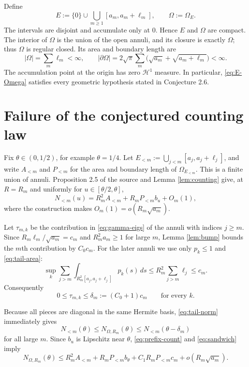 \documentclass[11pt]{article}
\newcommand{\cH}{\mathcal H}
\begin{document}
Define
\begin{equation}\label{eq:E-Omega}
 E:=\{0\}\cup\bigcup_{m\geq1}[a_m,a_m+\ell_m],
 \qquad \Omega:=\Omega_E.
\end{equation}
The intervals are disjoint and accumulate only at $0$.  Hence $E$ and
$\Omega$ are compact.  The interior of $\Omega$ is the union of the open
annuli, and its closure is exactly $\Omega$; thus $\Omega$ is regular closed.
Its area and boundary length are
\begin{equation}\label{eq:geometry}
 |\Omega|=\sum_m\ell_m<\infty,
 \qquad
 |\partial\Omega|
 =2\sqrt\pi\sum_m\bigl(\sqrt{a_m}+\sqrt{a_m+\ell_m}\bigr)<\infty.
\end{equation}
The accumulation point at the origin has zero $\cH^1$ measure.  In
particular, \eqref{eq:E-Omega} satisfies every geometric hypothesis stated in
Conjecture 2.6.

\section{Failure of the conjectured counting law}

Fix $\theta\in(0,1/2)$, for example $\theta=1/4$.  Let
$E_{<m}:=\bigcup_{j<m}[a_j,a_j+\ell_j]$, and write $A_{<m}$ and $P_{<m}$
for the area and boundary length of $\Omega_{E_{<m}}$.  This is a finite
union of annuli.  Proposition 2.5 of the source and Lemma
\ref{lem:counting} give, at $R=R_m$ and uniformly for
$u\in[\theta/2,\theta]$,
\begin{equation}\label{eq:prefix-count}
 N_{<m}(u)
 =R_m^2A_{<m}+R_mP_{<m}b_u+O_m(1),
\end{equation}
where the construction makes $O_m(1)=o(R_m\sqrt{a_m})$.

Let $\tau_{m,k}$ be the contribution in \eqref{eq:gamma-eigs} of the annuli
with indices $j\geq m$.  Since
$R_m\ell_m/\sqrt{a_m}=c_m$ and $R_m^2a_m\geq1$ for large $m$, Lemma
\ref{lem:bump} bounds the $m$th contribution by $C_0c_m$.  For the later
annuli we use only $p_k\leq1$ and \eqref{eq:tail-area}:
\[
 \sup_k\sum_{j>m}\int_{R_m^2[a_j,a_j+\ell_j]}p_k(s)\,ds
 \leq R_m^2\sum_{j>m}\ell_j\leq c_m.
\]
Consequently
\begin{equation}\label{eq:tail-norm}
 0\leq\tau_{m,k}\leq\delta_m:=(C_0+1)c_m
 \qquad\text{for every }k.
\end{equation}

Because all pieces are diagonal in the same Hermite basis,
\eqref{eq:tail-norm} immediately gives
\begin{equation}\label{eq:sandwich}
 N_{<m}(\theta)\leq N_{\Omega,R_m}(\theta)
 \leq N_{<m}(\theta-\delta_m)
\end{equation}
for all large $m$.  Since $b_u$ is Lipschitz near $\theta$,
\eqref{eq:prefix-count} and \eqref{eq:sandwich} imply
\begin{equation}\label{eq:actual-upper}
 N_{\Omega,R_m}(\theta)
 \leq R_m^2A_{<m}+R_mP_{<m}b_\theta
 +C_1R_mP_{<m}c_m+o(R_m\sqrt{a_m}).
\end{equation}
\end{document}
